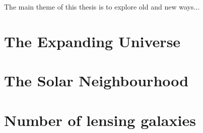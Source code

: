 The main theme of this thesis is to explore old and new ways...


\section{The Expanding Universe}


\section{The Solar Neighbourhood}


\section{Number of lensing galaxies}

